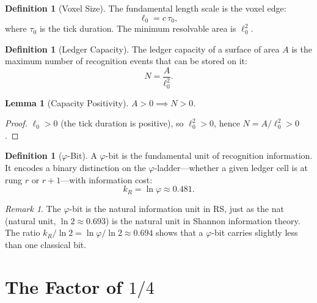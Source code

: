 \documentclass[12pt,a4paper]{article}
\newtheorem{lemma}[theorem]{Lemma}
\theoremstyle{definition}
\newtheorem{definition}[theorem]{Definition}
\theoremstyle{remark}
\newtheorem{remark}[theorem]{Remark}
\begin{document}
\begin{definition}[Voxel Size]
The fundamental length scale is the voxel edge:
\begin{equation}
  \ell_0 = c\,\tau_0,
\end{equation}
where $\tau_0$ is the tick duration.  The minimum
resolvable area is $\ell_0^2$.
\end{definition}

\begin{definition}[Ledger Capacity]
\label{def:capacity}
The ledger capacity of a surface of area $A$ is the maximum
number of recognition events that can be stored on it:
\begin{equation}
  N = \frac{A}{\ell_0^2}.
  \label{eq:N}
\end{equation}
\end{definition}

\begin{lemma}[Capacity Positivity]
\label{lem:capacity-pos}
$A > 0 \implies N > 0$.
\end{lemma}

\begin{proof}
$\ell_0 > 0$ (the tick duration is positive), so
$\ell_0^2 > 0$, hence $N = A/\ell_0^2 > 0$.
\end{proof}

\begin{definition}[$\varphi$-Bit]
\label{def:phibit}
A $\varphi$-bit is the fundamental unit of recognition
information.  It encodes a binary distinction on the
$\varphi$-ladder---whether a given ledger cell is at rung
$r$ or $r+1$---with information cost:
\begin{equation}
  k_R = \ln\varphi \approx 0.481.
  \label{eq:kR}
\end{equation}
\end{definition}

\begin{remark}
The $\varphi$-bit is the natural information unit in RS,
just as the nat (natural unit, $\ln 2 \approx 0.693$) is
the natural unit in Shannon information theory.  The ratio
$k_R/\ln 2 = \ln\varphi/\ln 2 \approx 0.694$ shows that a
$\varphi$-bit carries slightly less than one classical bit.
\end{remark}

\section{The Factor of $1/4$}
\label{sec:quarter}
\end{document}
